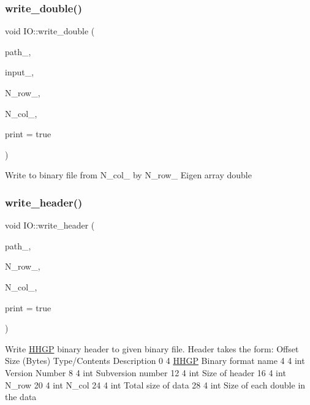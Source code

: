 \mbox{\label{class_i_o_a9a648215dc5e33abe2c5a8916fff06d4}} 
\subsubsection{\texorpdfstring{write\+\_\+double()}{write\_double()}}
{\footnotesize\ttfamily void I\+O\+::write\+\_\+double (\begin{DoxyParamCaption}\item[{const std\+::string}]{path\+\_\+,  }\item[{Array\+X\+Xd}]{input\+\_\+,  }\item[{int}]{N\+\_\+row\+\_\+,  }\item[{int}]{N\+\_\+col\+\_\+,  }\item[{bool}]{print = {\ttfamily true} }\end{DoxyParamCaption})}

Write to binary file from N\+\_\+col\+\_\+ by N\+\_\+row\+\_\+ Eigen array double\mbox{\label{class_i_o_a0db950886bb1e6d5571330f771974c4e}} 
\subsubsection{\texorpdfstring{write\+\_\+header()}{write\_header()}}
{\footnotesize\ttfamily void I\+O\+::write\+\_\+header (\begin{DoxyParamCaption}\item[{const std\+::string}]{path\+\_\+,  }\item[{int}]{N\+\_\+row\+\_\+,  }\item[{int}]{N\+\_\+col\+\_\+,  }\item[{bool}]{print = {\ttfamily true} }\end{DoxyParamCaption})}

Write \hyperlink{namespace_h_h_g_p}{H\+H\+GP} binary header to given binary file. Header takes the form\+: Offset Size (Bytes) Type/\+Contents Description 0 4 \textquotesingle{}\hyperlink{namespace_h_h_g_p}{H\+H\+GP}\textquotesingle{} Binary format name 4 4 int Version Number 8 4 int Subversion number 12 4 int Size of header 16 4 int N\+\_\+row 20 4 int N\+\_\+col 24 4 int Total size of data 28 4 int Size of each double in the data

